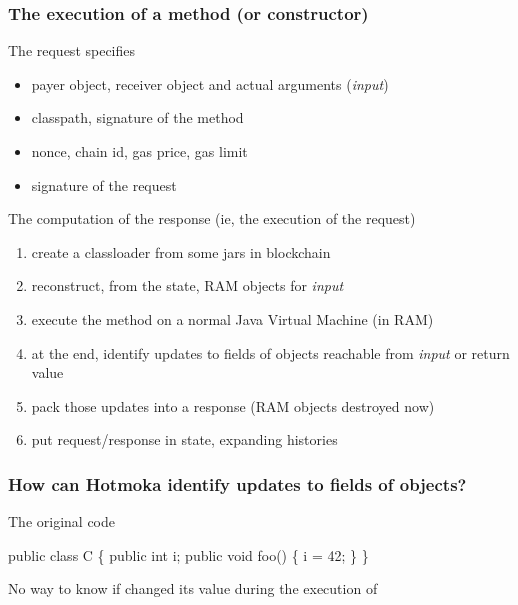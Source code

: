 \documentclass[11pt]{beamer}  %
\def\codesize{\smaller}
\def\<#1>{\codeid{#1}}
\newcommand{\codeid}[1]{\ifmmode{\mbox{\codesize\ttfamily{#1}}}\else{\codesize\ttfamily #1}\fi}
\begin{document}
\begin{frame}\frametitle{The execution of a method (or constructor)}

  \begin{greenbox}{The request specifies}
    \begin{itemize}
    \item payer object, receiver object and actual arguments (\emph{input})
    \item classpath, signature of the method
    \item nonce, chain id, gas price, gas limit
    \item signature of the request
    \end{itemize}
  \end{greenbox}

  \bigskip

  \begin{greenbox}{The computation of the response (ie, the execution of the request)}
    \begin{enumerate}
    \item create a classloader from some jars in blockchain
    \item reconstruct, from the state, RAM objects for \emph{input}
    \item execute the method on a normal Java Virtual Machine (in RAM)
    \item at the end, identify updates to fields of objects reachable from \emph{input}
      or return value
    \item pack those updates into a response (RAM objects destroyed now)
    \item put request/response in state, expanding histories
    \end{enumerate}
  \end{greenbox}

\end{frame}

\begin{frame}[fragile]\frametitle{How can Hotmoka identify updates to fields of objects?}

  \begin{greenbox}{The original code}
    \begin{semiverbatim}
      public class C \{
        public {\color{blue}int i;}
        public void foo() \{
          {\color{blue}i} = 42;
        \}
      \}
    \end{semiverbatim}
  \end{greenbox}

  \begin{center}
    No way to know if \<i> changed its value during the execution of \<foo()>
  \end{center}

\end{frame}
\end{document}
